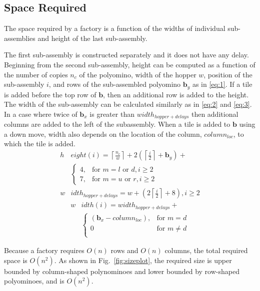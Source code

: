 \subsection{Space Required}\label{sec:requiredSpace}
The space required by a factory is a function of the widths of individual sub-assemblies and height of the last sub-assembly.


The first sub-assembly is constructed separately and it does not have any delay.
Beginning from the second sub-assembly, height can be computed as a function of the number of copies $n_c$ of the polyomino, width of the hopper $w$, position of the sub-assembly $i$, and rows of the sub-assembled polyomino $\mathbf{b}_y$ as in \eqref{eq:1}. If a tile is added before the top row of $\mathbf{b}$, then an additional row is added to the height.
The width of the sub-assembly can be calculated similarly as in \eqref{eq:2} and \eqref{eq:3}. 
In a case where twice of $\mathbf{b}_x$ is greater than $width_{hopper+delays}$ then additional columns are added to the left of the subassembly. 
When a tile is added to $\mathbf{b}$ using a down move, width also depends on the location of the column, $column_{loc}$, to which the tile is added.  
\begin{align}
h&eight(i) = \left \lceil{ \frac{n_c}{w}}\right \rceil+2\left(\left \lceil{\frac{i}{2}}\right \rceil+\mathbf{b}_y\right)+ \nonumber \\
&\begin{cases}
  4,&\text{for } m = l \text{ or } d, i \geq 2\\
7,&\text{for } m = u \text{ or } r, i \geq 2 
\end{cases}\label{eq:1} \\
w&idth_{hopper+delays}=w+(2\left \lceil{ \frac{i}{2}}\right \rceil+8),  i \geq 2 \label{eq:2} \end{align}
\begin{align}
w&idth(i)=width_{hopper+delays} +\nonumber\\
&\begin{cases}
(\mathbf{b}_x-column_{loc}),&\text{for } m = d \\
0 &\text{for } m \neq d \\ \label{eq:3}
\end{cases}
\end{align}
  

Because a factory requires $O(n)$ rows and $O(n)$ columns, the total required space is $O(n^2)$.
As shown in Fig.~\ref{fig:sizeplot}, the required size is  upper bounded by column-shaped polynominoes and lower bounded by row-shaped polyominoes, and is $O(n^2)$.

